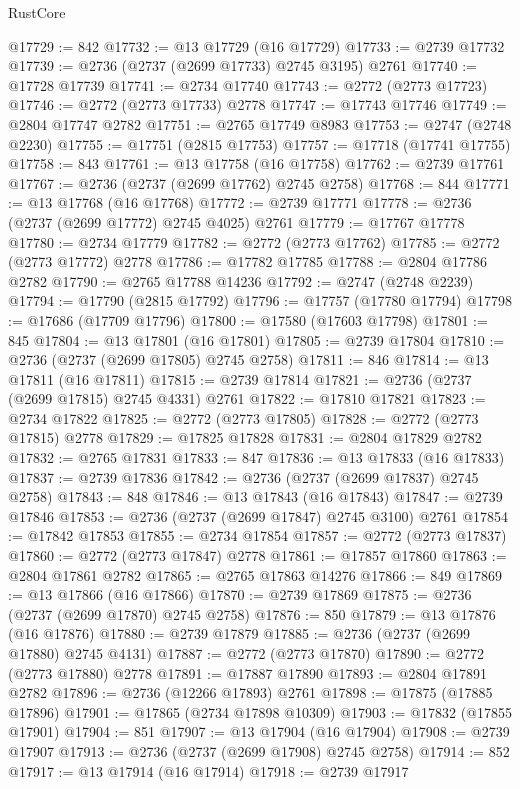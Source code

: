 \begin{lexlean}{RustCore}
\begin{coremodule}
@17729 := 842
@17732 := @13 @17729 (@16 @17729)
@17733 := @2739 @17732
@17739 := @2736 (@2737 (@2699 @17733) @2745 @3195) @2761
@17740 := @17728 @17739
@17741 := @2734 @17740
@17743 := @2772 (@2773 @17723)
@17746 := @2772 (@2773 @17733) @2778
@17747 := @17743 @17746
@17749 := @2804 @17747 @2782
@17751 := @2765 @17749 @8983
@17753 := @2747 (@2748 @2230)
@17755 := @17751 (@2815 @17753)
@17757 := @17718 (@17741 @17755)
@17758 := 843
@17761 := @13 @17758 (@16 @17758)
@17762 := @2739 @17761
@17767 := @2736 (@2737 (@2699 @17762) @2745 @2758)
@17768 := 844
@17771 := @13 @17768 (@16 @17768)
@17772 := @2739 @17771
@17778 := @2736 (@2737 (@2699 @17772) @2745 @4025) @2761
@17779 := @17767 @17778
@17780 := @2734 @17779
@17782 := @2772 (@2773 @17762)
@17785 := @2772 (@2773 @17772) @2778
@17786 := @17782 @17785
@17788 := @2804 @17786 @2782
@17790 := @2765 @17788 @14236
@17792 := @2747 (@2748 @2239)
@17794 := @17790 (@2815 @17792)
@17796 := @17757 (@17780 @17794)
@17798 := @17686 (@17709 @17796)
@17800 := @17580 (@17603 @17798)
@17801 := 845
@17804 := @13 @17801 (@16 @17801)
@17805 := @2739 @17804
@17810 := @2736 (@2737 (@2699 @17805) @2745 @2758)
@17811 := 846
@17814 := @13 @17811 (@16 @17811)
@17815 := @2739 @17814
@17821 := @2736 (@2737 (@2699 @17815) @2745 @4331) @2761
@17822 := @17810 @17821
@17823 := @2734 @17822
@17825 := @2772 (@2773 @17805)
@17828 := @2772 (@2773 @17815) @2778
@17829 := @17825 @17828
@17831 := @2804 @17829 @2782
@17832 := @2765 @17831
@17833 := 847
@17836 := @13 @17833 (@16 @17833)
@17837 := @2739 @17836
@17842 := @2736 (@2737 (@2699 @17837) @2745 @2758)
@17843 := 848
@17846 := @13 @17843 (@16 @17843)
@17847 := @2739 @17846
@17853 := @2736 (@2737 (@2699 @17847) @2745 @3100) @2761
@17854 := @17842 @17853
@17855 := @2734 @17854
@17857 := @2772 (@2773 @17837)
@17860 := @2772 (@2773 @17847) @2778
@17861 := @17857 @17860
@17863 := @2804 @17861 @2782
@17865 := @2765 @17863 @14276
@17866 := 849
@17869 := @13 @17866 (@16 @17866)
@17870 := @2739 @17869
@17875 := @2736 (@2737 (@2699 @17870) @2745 @2758)
@17876 := 850
@17879 := @13 @17876 (@16 @17876)
@17880 := @2739 @17879
@17885 := @2736 (@2737 (@2699 @17880) @2745 @4131)
@17887 := @2772 (@2773 @17870)
@17890 := @2772 (@2773 @17880) @2778
@17891 := @17887 @17890
@17893 := @2804 @17891 @2782
@17896 := @2736 (@12266 @17893) @2761
@17898 := @17875 (@17885 @17896)
@17901 := @17865 (@2734 @17898 @10309)
@17903 := @17832 (@17855 @17901)
@17904 := 851
@17907 := @13 @17904 (@16 @17904)
@17908 := @2739 @17907
@17913 := @2736 (@2737 (@2699 @17908) @2745 @2758)
@17914 := 852
@17917 := @13 @17914 (@16 @17914)
@17918 := @2739 @17917

\end{coremodule}
\end{lexlean}
